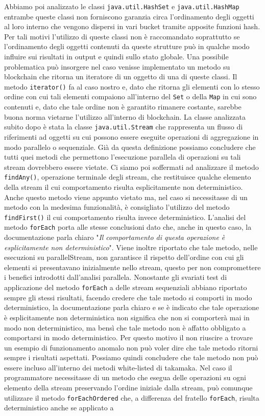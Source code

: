 Abbiamo poi analizzato le classi \lstinline|java.util.HashSet| e \lstinline|java.util.HashMap| entrambe queste classi non forniscono garanzia circa l'ordinamento degli oggetti al loro interno che vengono dispersi in vari bucket tramite apposite funzioni hash. Per tali motivi l'utilizzo di queste classi non è raccomandato soprattutto se l'ordinamento degli oggetti contenuti da queste strutture può in qualche modo influire sui risultati in output e quindi sullo stato globale. Una possibile problematica può insorgere nel caso venisse implementato un metodo su blockchain che ritorna un iteratore di un oggetto di una di queste classi. Il metodo \lstinline|iterator()| fa al caso nostro e, dato che ritorna gli elementi con lo stesso ordine con cui tali elementi compaiono all'interno del \lstinline|Set| o della \lstinline|Map| in cui sono contenuti e, dato che tale ordine non è garantito rimanere costante, sarebbe buona norma vietarne l'utilizzo all'interno di blockchain. La classe analizzata subito dopo è stata la classe \lstinline|java.util.Stream| che rappresenta un flusso di riferimenti ad oggetti su cui possono essere eseguite operazioni di aggregazione in modo parallelo o sequenziale. Già da questa definizione possiamo concludere che tutti quei metodi che permettono l'esecuzione parallela di operazioni su tali stream dovrebbero essere vietate. Ci siamo poi soffermati ad analizzare il metodo \lstinline|findAny()|, operazione terminale degli stream, che restituisce qualche elemento della stream il cui comportamento risulta esplicitamente non deterministico. Anche questo metodo viene appunto vietato ma, nel caso si necessitasse di un metodo con la medesima funzionalità, è consigliato l'utilizzo del metodo \lstinline|findFirst()| il cui comportamento risulta invece deterministico. L'analisi del metodo \lstinline|forEach| porta alle stesse conclusioni dato che, anche in questo caso, la documentazione parla chiaro "\textit{Il comportamento di questa operazione è esplicitamente non deterministico}". Viene inoltre riportato che tale metodo, nelle esecuzioni su parallelStream, non garantisce il rispetto dell'ordine con cui gli elementi si presentavano inizialmente nello stream, questo per non compromettere i benefici introdotti dall'analisi parallela. Nonostante gli svariati test di applicazione del metodo \lstinline|forEach| a delle stream sequenziali abbiano riportato sempre gli stessi risultati, facendo credere che tale metodo si comporti in modo deterministico, la documentazione parla chiaro e se è indicato che tale operazione è esplicitamente non deterministica non significa che non si comporterà mai in modo non deterministico, ma bensì che tale metodo non è affatto obbligato a comportarsi in modo deterministico. Per questo motivo il non riuscire a trovare un esempio di funzionamento anomalo non può voler dire che tale metodo ritorni sempre i risultati aspettati. Possiamo quindi concludere che tale metodo non può essere incluso all'interno dei metodi white-listed di takamaka. Nel caso il programmatore necessitasse di un metodo che esegua delle operazioni su ogni elemento della stream preservando l'ordine iniziale dalla stream, può comunque utilizzare il metodo \lstinline|forEachOrdered| che, a differenza del fratello \lstinline|forEach|, risulta deterministico anche se applicato a 